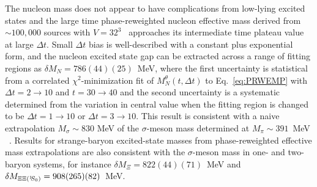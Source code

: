 The nucleon mass does not appear to have complications from low-lying excited states
and the large time phase-reweighted nucleon effective mass
derived from $\sim 100,000$ sources with $V=32^3$~\cite{Orginos:2015aya}
approaches its intermediate time plateau value at large $\Delta t$.
Small $\Delta t$ bias is well-described with a constant plus exponential form, and
the nucleon excited state gap can be 
extracted across a range of fitting regions as $\delta M_N = 786(44)(25)$~MeV, 
where the first uncertainty is statistical from a correlated $\chi^2$-minimization fit of $M_N^\theta(t,\Delta t)$ 
to Eq.~\eqref{eq:PRWEMP}
with $\Delta t = 2\rightarrow 10$ and $t = 30\rightarrow 40$  and the second uncertainty is a systematic  
determined from the variation in central value when the fitting region is changed to be $\Delta t = 1\rightarrow 10$ or $\Delta t = 3\rightarrow 10$. 
This result is consistent with a naive extrapolation $M_\sigma \sim 830$ MeV of the $\sigma$-meson mass 
determined at $M_\pi \sim 391$~MeV
~\cite{Briceno:2016mjc}. 
Results for strange-baryon excited-state masses from phase-reweighted effective mass extrapolations  are also 
consistent with the $\sigma$-meson mass in one- and two-baryon systems,
for instance $\delta M_{\Xi} = 822(44)(71)$~MeV and $\delta M_{\Xi\Xi(\si)} = 908(265)(82)$~MeV.






